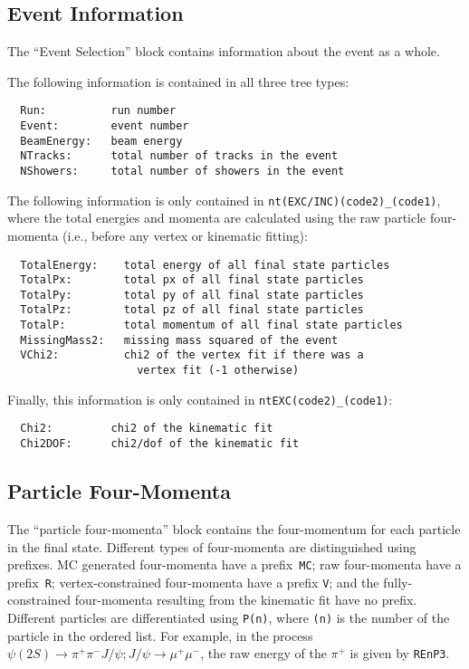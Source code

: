 \documentclass[11pt]{article}
\begin{document}
\subsection{Event Information}

The ``Event Selection'' block contains information about the event as a whole.

The following information is contained in all three tree types:
\begin{verbatim}
  Run:          run number
  Event:        event number
  BeamEnergy:   beam energy
  NTracks:      total number of tracks in the event
  NShowers:     total number of showers in the event
\end{verbatim}
The following information is only contained in {\tt nt(EXC/INC)(code2)\_(code1)}, where the total energies and momenta are calculated using the raw particle four-momenta (i.e., before any vertex or kinematic fitting):
\begin{verbatim}
  TotalEnergy:    total energy of all final state particles
  TotalPx:        total px of all final state particles
  TotalPy:        total py of all final state particles
  TotalPz:        total pz of all final state particles
  TotalP:         total momentum of all final state particles
  MissingMass2:   missing mass squared of the event
  VChi2:          chi2 of the vertex fit if there was a
                    vertex fit (-1 otherwise)
\end{verbatim}
Finally, this information is only contained in {\tt ntEXC(code2)\_(code1)}:
\begin{verbatim}
  Chi2:         chi2 of the kinematic fit
  Chi2DOF:      chi2/dof of the kinematic fit
\end{verbatim}


\subsection{Particle Four-Momenta}

The ``particle four-momenta'' block contains the four-momentum for each particle in the final state.  Different types of four-momenta are distinguished using prefixes.  MC generated four-momenta have a prefix~{\tt MC}; raw four-momenta have a prefix~{\tt R}; vertex-constrained four-momenta have a prefix {\tt V}; and the fully-constrained four-momenta resulting from the kinematic fit have no prefix.  Different particles are differentiated using {\tt P(n)}, where {\tt (n)} is the number of the particle in the ordered list.  For example, in the process $\psi(2S)\to\pi^+\pi^-J/\psi; J/\psi\to\mu^+\mu^-$, the raw energy of the $\pi^+$ is given by {\tt REnP3}.
\end{document}
